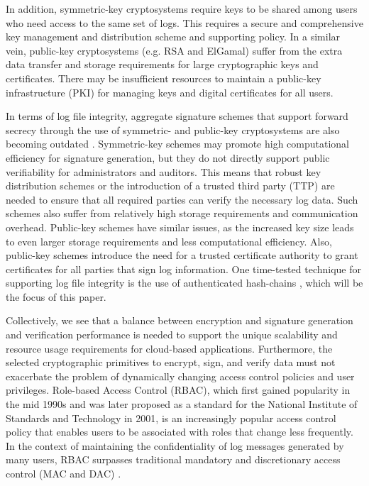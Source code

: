 \documentclass{sig-alternate}
\begin{document}
In addition, symmetric-key cryptosystems require keys to be shared among users who need access to the 
same set of logs. This requires a secure and comprehensive key management and distribution scheme and
supporting policy. In a similar vein, public-key cryptosystems (e.g. RSA and ElGamal) suffer 
from the extra data transfer and storage requirements for large cryptographic keys and certificates. There 
may be insufficient resources to maintain a public-key infrastructure (PKI) for managing keys and digital 
certificates for all users. 

In terms of log file integrity, aggregate signature schemes that support forward secrecy through the use of 
symmetric- and public-key cryptosystems are also becoming outdated \cite{Yavuz2009-BAF}. 
Symmetric-key schemes may promote high computational efficiency for signature generation, but they 
do not directly support public verifiability for administrators and auditors. This means that robust key 
distribution schemes or the introduction of a trusted third party (TTP) are needed to ensure that all 
required parties can verify the necessary log data. Such schemes also 
suffer from relatively high storage requirements and communication overhead. Public-key 
schemes have similar issues, as the increased key size leads to even larger storage 
requirements and less computational efficiency. Also, public-key schemes introduce the need
for a trusted certificate authority to grant certificates for all parties that sign log information. %
One time-tested technique for supporting log file integrity is the use of authenticated 
hash-chains \cite{Schneier1999-Secure}, which will be the focus of this paper.

Collectively, we see that a balance between encryption and signature generation and verification performance is
needed to support the unique scalability and resource usage requirements for cloud-based applications.
Furthermore, the selected cryptographic primitives to encrypt, sign, and verify data must not exacerbate the
problem of dynamically changing access control policies and user privileges. Role-based Access Control (RBAC),
which first gained popularity in the mid 1990s \cite{Sandhu1996-RBAC} \cite{David1992-RBAC} and was later 
proposed as a standard for the National Institute of Standards and Technology in 2001\cite{Ferraiolo2001-RBAC}, 
is an increasingly popular access control policy that enables users to be associated with roles that change
less frequently. In the context of maintaining the confidentiality of log messages generated by many users,
RBAC surpasses traditional mandatory and discretionary access control (MAC and DAC) 
\cite{Abrams1990-AccessControl}.
\end{document}
